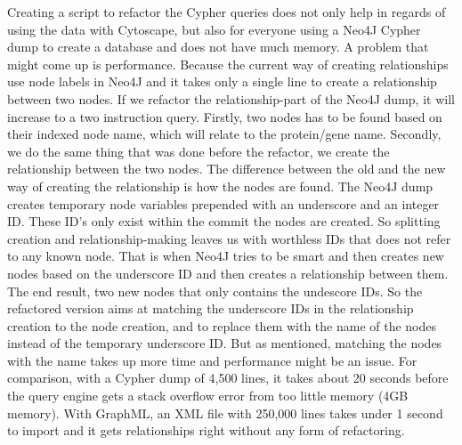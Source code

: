 Creating a script to refactor the Cypher queries does not only help in regards
of using the data with Cytoscape, but also for everyone using a Neo4J Cypher
dump to create a database and does not have much memory. A problem that might
come up is performance. Because the current way of creating relationships use
node labels in Neo4J and it takes only a single line to create a relationship
between two nodes. If we refactor the relationship-part of the Neo4J dump, it
will increase to a two instruction query. Firstly, two nodes has to be found
based on their indexed node name, which will relate to the protein/gene name.
Secondly, we do the same thing that was done before the refactor, we create the
relationship between the two nodes. The difference between the old and the new
way of creating the relationship is how the nodes are found. The Neo4J dump
creates temporary node variables prepended with an underscore and an integer ID.
These ID's only exist within the commit the nodes are created. So splitting
creation and relationship-making leaves us with worthless IDs that does not
refer to any known node. That is when Neo4J tries to be smart and then creates
new nodes based on the underscore ID and then creates a relationship between
them. The end result, two new nodes that only contains the undescore IDs. So the
refactored version aims at matching the underscore IDs in the relationship
creation to the node creation, and to replace them with the name of the nodes
instead of the temporary underscore ID. But as mentioned, matching the nodes
with the name takes up more time and performance might be an issue. For
comparison, with a Cypher dump of 4,500 lines, it takes about 20 seconds before
the query engine gets a stack overflow error from too little memory (4GB
memory). With GraphML, an XML file with 250,000 lines takes under 1 second to
import and it gets relationships right without any form of refactoring.
